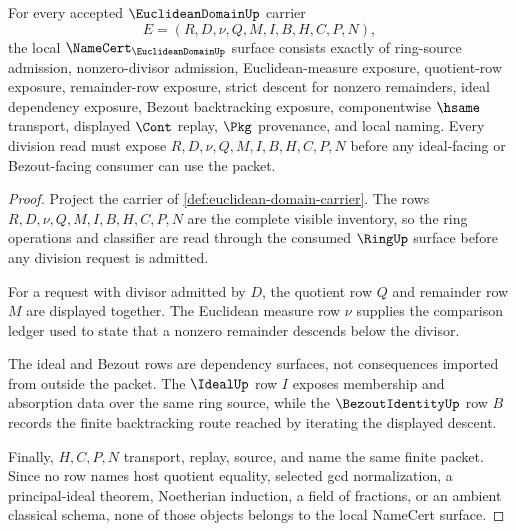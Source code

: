 \begin{theorem}
\label{thm:euclidean-domain-namecert-obligations}
For every accepted $\EuclideanDomainUp$ carrier
$$
E=(R,D,\nu,Q,M,I,B,H,C,P,N),
$$
the local $\NameCert_{\EuclideanDomainUp}$ surface consists exactly of ring-source admission, nonzero-divisor admission, Euclidean-measure exposure, quotient-row exposure, remainder-row exposure, strict descent for nonzero remainders, ideal dependency exposure, Bezout backtracking exposure, componentwise $\hsame$ transport, displayed $\Cont$ replay, $\Pkg$ provenance, and local naming. Every division read must expose $R,D,\nu,Q,M,I,B,H,C,P,N$ before any ideal-facing or Bezout-facing consumer can use the packet.
\end{theorem}
\begin{proof}
Project the carrier of \autoref{def:euclidean-domain-carrier}. The rows $R,D,\nu,Q,M,I,B,H,C,P,N$ are the complete visible inventory, so the ring operations and classifier are read through the consumed $\RingUp$ surface before any division request is admitted.

For a request with divisor admitted by $D$, the quotient row $Q$ and remainder row $M$ are displayed together. The Euclidean measure row $\nu$ supplies the comparison ledger used to state that a nonzero remainder descends below the divisor.

The ideal and Bezout rows are dependency surfaces, not consequences imported from outside the packet. The $\IdealUp$ row $I$ exposes membership and absorption data over the same ring source, while the $\BezoutIdentityUp$ row $B$ records the finite backtracking route reached by iterating the displayed descent.

Finally, $H,C,P,N$ transport, replay, source, and name the same finite packet. Since no row names host quotient equality, selected gcd normalization, a principal-ideal theorem, Noetherian induction, a field of fractions, or an ambient classical schema, none of those objects belongs to the local NameCert surface.
\end{proof}


